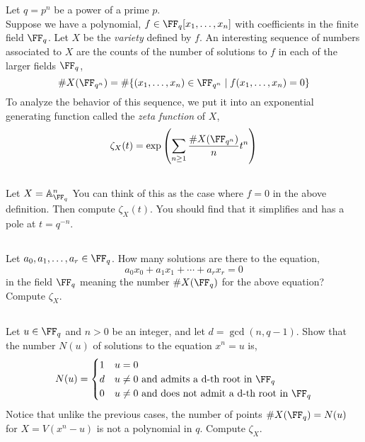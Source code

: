 \documentclass[12pt]{article}
\begin{document}
Let $q = p^n$ be a power of a prime $p$. 
\\
Suppose we have a polynomial, $f \in \FF_q[x_1, \dots, x_n]$ with coefficients in the finite field $\FF_q$. Let $X$ be the \textit{variety} defined by $f$. An interesting sequence of numbers associated to $X$ are the counts of the number of solutions to $f$ in each of the larger fields $\FF_q$,
\[ \# X(\FF_{q^n}) = \# \{ (x_1, \dots, x_n) \in \FF_{q^n} \mid f(x_1, \dots, x_n) = 0 \} \]
To analyze the behavior of this sequence, we put it into an exponential generating function called the \textit{zeta function} of $X$,
\[ \zeta_X(t) = \exp{ \left( \sum_{n \ge 1} \frac{\# X(\FF_{q^n})}{n} t^n \right)} \]

\subsection{}

Let $X = \A^n_{\FF_q}$ You can think of this as the case where $f = 0$ in the above definition. Then compute $\zeta_X(t)$. You should find that it simplifies and has a pole at $t = q^{-n}$.


\subsection{}

Let $a_0, a_1, \dots, a_r \in \FF_q$. How many solutions are there to the equation,
\[ a_0 x_0 + a_1 x_1 + \cdots + a_r x_r = 0 \]
in the field $\FF_q$ meaning the number $\# X(\FF_q)$ for the above equation? Compute $\zeta_X$.

\subsection{}

Let $u \in \FF_q$ and $n > 0$ be an integer, and let $d = \gcd(n, q-1)$. Show that the number $N(u)$ of solutions to the equation $x^n = u$ is,
\[ N(u) = \begin{cases}
1 & u = 0
\\
d & u \neq 0 \text{ and admits a d-th root in } \FF_q
\\
0 & u \neq 0 \text{ and does not admit a d-th root in } \FF_q
\end{cases} \]
Notice that unlike the previous cases, the number of points $\# X(\FF_q) = N(u)$ for $X = V(x^n - u)$ is not a polynomial in $q$. Compute $\zeta_X$.


\subsection{} \label{hyperelliptic}
\end{document}
